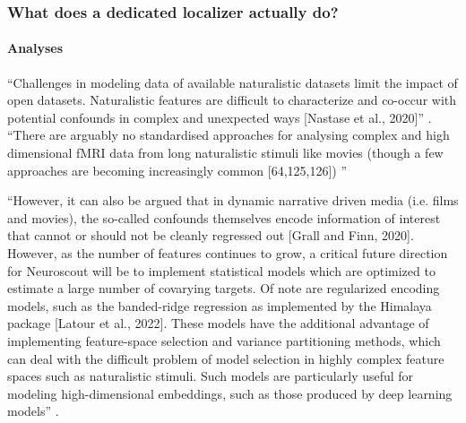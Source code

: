
\subsubsection{What does a dedicated localizer actually do?}



\paragraph{Analyses}

%
``Challenges in modeling data of available naturalistic datasets limit the
impact of open datasets.
%
Naturalistic features are difficult to characterize and co-occur with potential
confounds in complex and unexpected ways [Nastase et al., 2020]''
\citep{delavega2022neuroscout}.
%
``There are arguably no standardised approaches for analysing complex and high
dimensional fMRI data from long naturalistic stimuli like movies (though a few
approaches are becoming increasingly common  [64,125,126])
\citep{aliko2020naturalistic}''

%
``However, it can also be argued that in dynamic narrative driven media (i.e.
films and movies), the so-called confounds themselves encode information of
interest that cannot or should not be cleanly regressed out [Grall and Finn,
2020].
%
However, as the number of features continues to grow, a critical future
direction for Neuroscout will be to implement statistical models which are
optimized to estimate a large number of covarying targets.
%
Of note are regularized encoding models, such as the banded-ridge regression as
implemented by the Himalaya package [Latour et al., 2022].
%
These models have the additional advantage of implementing feature-space
selection and variance partitioning methods, which can deal with the difficult
problem of model selection in highly complex feature spaces such as naturalistic
stimuli.
%
Such models are particularly useful for modeling high-dimensional embeddings,
such as those produced by deep learning models'' \citep{delavega2022neuroscout}.


